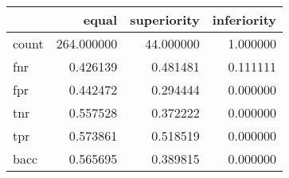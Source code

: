 \begin{tabular}{lrrr}
\toprule
{} &       equal &  superiority &  inferiority \\
\midrule
count &  264.000000 &    44.000000 &     1.000000 \\
fnr   &    0.426139 &     0.481481 &     0.111111 \\
fpr   &    0.442472 &     0.294444 &     0.000000 \\
tnr   &    0.557528 &     0.372222 &     0.000000 \\
tpr   &    0.573861 &     0.518519 &     0.000000 \\
bacc  &    0.565695 &     0.389815 &     0.000000 \\
\bottomrule
\end{tabular}

